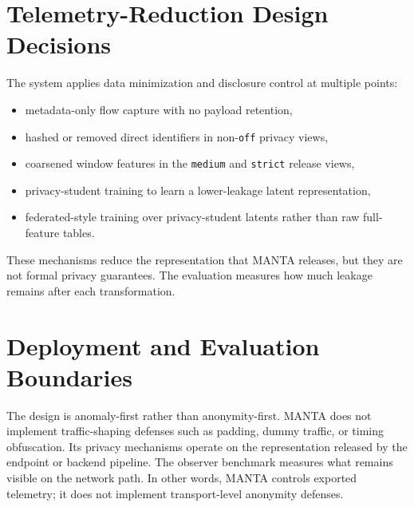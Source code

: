\section{Telemetry-Reduction Design Decisions}
The system applies data minimization and disclosure control at multiple points:
\begin{itemize}[leftmargin=*]
  \item metadata-only flow capture with no payload retention,
  \item hashed or removed direct identifiers in non-\texttt{off} privacy views,
  \item coarsened window features in the \texttt{medium} and \texttt{strict} release views,
  \item privacy-student training to learn a lower-leakage latent representation,
  \item federated-style training over privacy-student latents rather than raw full-feature tables.
\end{itemize}

These mechanisms reduce the representation that MANTA releases, but they are not formal privacy
guarantees. The evaluation measures how much leakage remains after each transformation.

\section{Deployment and Evaluation Boundaries}
The design is anomaly-first rather than anonymity-first. MANTA does not implement traffic-shaping
defenses such as padding, dummy traffic, or timing obfuscation. Its privacy mechanisms operate on
the representation released by the endpoint or backend pipeline. The observer benchmark measures
what remains visible on the network path. In other words, MANTA controls exported telemetry; it does
not implement transport-level anonymity defenses.
